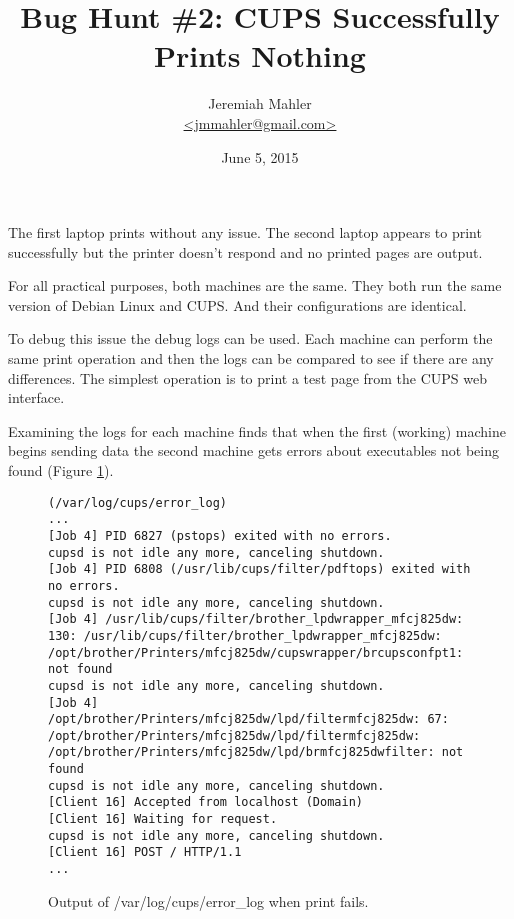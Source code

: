 \documentclass{article}
\begin{document}
\title{Bug Hunt \#2: CUPS Successfully Prints Nothing}
\author{
	\Large{Jeremiah Mahler}\\
	\small{\href{mailto:jmmahler@gmail.com}{\textless jmmahler@gmail.com\textgreater}}
}
\date{June 5, 2015}
\maketitle


The first laptop prints without any issue.
The second laptop appears to print successfully but the printer
doesn't respond and no printed pages are output.

For all practical purposes, both machines are the same.
They both run the same version of Debian Linux and CUPS\autocite{cups}.
And their configurations are identical.

To debug this issue the debug logs can be used.  Each machine can
perform the same print operation and then the logs can be compared to
see if there are any differences.  The simplest operation is to
print a test page from the CUPS web interface.

Examining the logs for each machine finds that when the first (working)
machine begins sending data the second machine gets errors about
executables not being found (Figure \ref{fig:log}).

\begin{figure}[h!]
\begin{lstlisting}[breaklines=true]
(/var/log/cups/error_log)
...
[Job 4] PID 6827 (pstops) exited with no errors.
cupsd is not idle any more, canceling shutdown.
[Job 4] PID 6808 (/usr/lib/cups/filter/pdftops) exited with no errors.
cupsd is not idle any more, canceling shutdown.
[Job 4] /usr/lib/cups/filter/brother_lpdwrapper_mfcj825dw: 130: /usr/lib/cups/filter/brother_lpdwrapper_mfcj825dw: /opt/brother/Printers/mfcj825dw/cupswrapper/brcupsconfpt1: not found
cupsd is not idle any more, canceling shutdown.
[Job 4] /opt/brother/Printers/mfcj825dw/lpd/filtermfcj825dw: 67: /opt/brother/Printers/mfcj825dw/lpd/filtermfcj825dw: /opt/brother/Printers/mfcj825dw/lpd/brmfcj825dwfilter: not found
cupsd is not idle any more, canceling shutdown.
[Client 16] Accepted from localhost (Domain)
[Client 16] Waiting for request.
cupsd is not idle any more, canceling shutdown.
[Client 16] POST / HTTP/1.1
...
\end{lstlisting}
\caption{Output of /var/log/cups/error\_log when print fails.}
\label{fig:log}
\end{figure}
\end{document}
